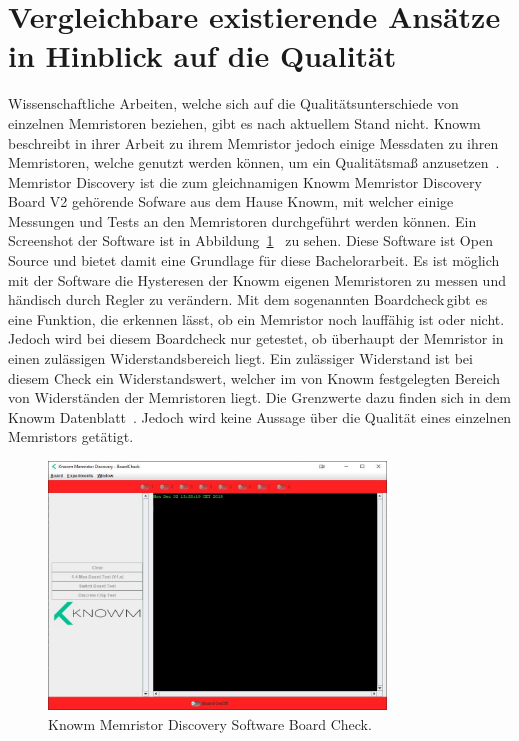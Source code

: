 \section{Vergleichbare existierende Ansätze in Hinblick auf die Qualität}
\label{sec:Qualität}
Wissenschaftliche Arbeiten, welche sich auf die Qualitätsunterschiede von einzelnen Memristoren beziehen, gibt es nach aktuellem Stand nicht. Knowm beschreibt in ihrer Arbeit zu ihrem Memristor jedoch einige Messdaten zu ihren Memristoren, welche genutzt werden können, um ein Qualitätsmaß anzusetzen~\cite{knowm_comp_2019}. Memristor Discovery ist die zum gleichnamigen Knowm Memristor Discovery Board V2 gehörende Sofware aus dem Hause Knowm, mit welcher einige Messungen und Tests an den Memristoren durchgeführt werden können. Ein Screenshot der Software ist in Abbildung~\ref{fig:knowm_discovery}~ zu sehen. Diese Software ist Open Source und bietet damit eine Grundlage für diese Bachelorarbeit. Es ist möglich mit der Software die Hysteresen der Knowm eigenen Memristoren zu messen und händisch durch Regler zu verändern. Mit dem sogenannten \glqq Boardcheck\grqq\,gibt es eine Funktion, die erkennen lässt, ob ein Memristor noch lauffähig ist oder nicht. Jedoch wird bei diesem Boardcheck nur getestet, ob überhaupt der Memristor in einen zulässigen Widerstandsbereich liegt. Ein zulässiger Widerstand ist bei diesem Check ein Widerstandswert, welcher im von Knowm festgelegten Bereich von Widerständen der Memristoren liegt. Die Grenzwerte dazu finden sich in dem Knowm Datenblatt~\cite{knowm_comp_2019}. Jedoch wird keine Aussage über die Qualität eines einzelnen Memristors getätigt.

\begin{figure}
  \centering
    \includegraphics[width=0.8\textwidth]{images/Memristor_Discovery_tmp.jpg}
  \caption{Knowm Memristor Discovery Software \glqq Board Check\grqq.}
  \label{fig:knowm_discovery}
\end{figure}

